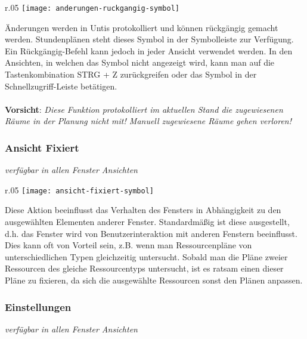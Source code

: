 \begin{wrapfigure}{r}{.05\textwidth}
	\vspace{-50pt}
	\texttt{[image: anderungen-ruckgangig-symbol]}
	\vspace{-35pt}
\end{wrapfigure}

\noindent
Änderungen werden in Untis protokolliert und können rückgängig gemacht werden. Stundenplänen steht dieses Symbol in der Symbolleiste zur Verfügung. Ein Rückgängig-Befehl kann jedoch in jeder Ansicht verwendet werden. In den Ansichten, in welchen das Symbol nicht angezeigt wird, kann man auf die Tastenkombination STRG + Z zurückgreifen oder das Symbol in der Schnellzugriff-Leiste betätigen.\\
\\
\textbf{Vorsicht}: \textit{Diese Funktion protokolliert im aktuellen Stand die zugewiesenen Räume in der Planung nicht mit! Manuell zugewiesene Räume gehen verloren!}\\

\subsubsection{Ansicht Fixiert}
{\small\textit{verfügbar in allen Fenster Ansichten\\}\par}

\begin{wrapfigure}{r}{.05\textwidth}
	\vspace{-50pt}
	\texttt{[image: ansicht-fixiert-symbol]}
	\vspace{-35pt}
\end{wrapfigure}

\noindent
Diese Aktion beeinflusst das Verhalten des Fensters in Abhängigkeit zu den ausgewählten Elementen anderer Fenster. Standardmäßig ist diese ausgestellt, d.h. das Fenster wird von Benutzerinteraktion mit anderen Fenstern beeinflusst. Dies kann oft von Vorteil sein, z.B. wenn man Ressourcenpläne von unterschiedlichen Typen gleichzeitig untersucht. Sobald man die Pläne zweier Ressourcen des gleiche Ressourcentyps untersucht, ist es ratsam einen dieser Pläne zu fixieren, da sich die ausgewählte Ressourcen sonst den Plänen anpassen.\\

\newpage

\subsubsection{Einstellungen}
\label{sec:einstellungen}
{\small\textit{verfügbar in allen Fenster Ansichten\\}\par}

